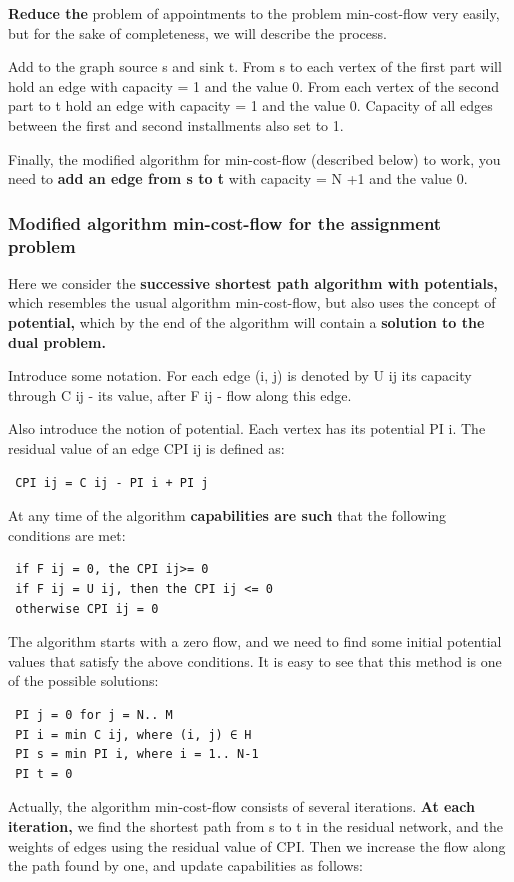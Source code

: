 \textbf{Reduce the} problem of appointments to the problem min-cost-flow very easily, but for the sake of completeness, we will describe the process.

Add to the graph source s and sink t. From s to each vertex of the first part will hold an edge with capacity = 1 and the value 0. From each vertex of the second part to t hold an edge with capacity = 1 and the value 0. Capacity of all edges between the first and second installments also set to 1.

Finally, the modified algorithm for min-cost-flow (described below) to work, you need to \textbf{add an edge from s to t} with capacity = N +1 and the value 0.

\subsubsection{ Modified algorithm min-cost-flow for the assignment problem }
Here we consider the \textbf{successive shortest path algorithm with potentials,} which resembles the usual algorithm min-cost-flow, but also uses the concept of \textbf{potential,} which by the end of the algorithm will contain a \textbf{solution to the dual problem.}

Introduce some notation. For each edge (i, j) is denoted by U ij its capacity through C ij - its value, after F ij - flow along this edge.

Also introduce the notion of potential. Each vertex has its potential PI i. The residual value of an edge CPI ij is defined as:

\begin{verbatim}
 CPI ij = C ij - PI i + PI j 
\end{verbatim}
At any time of the algorithm \textbf{capabilities are such} that the following conditions are met:

\begin{verbatim}
 if F ij = 0, the CPI ij>= 0
 if F ij = U ij, then the CPI ij <= 0
 otherwise CPI ij = 0 
\end{verbatim}
The algorithm starts with a zero flow, and we need to find some initial potential values ​​that satisfy the above conditions. It is easy to see that this method is one of the possible solutions:

\begin{verbatim}
 PI j = 0 for j = N.. M
 PI i = min C ij, where (i, j) ∈ H
 PI s = min PI i, where i = 1.. N-1
 PI t = 0 
\end{verbatim}
Actually, the algorithm min-cost-flow consists of several iterations. \textbf{At each iteration,} we find the shortest path from s to t in the residual network, and the weights of edges using the residual value of CPI. Then we increase the flow along the path found by one, and update capabilities as follows:

